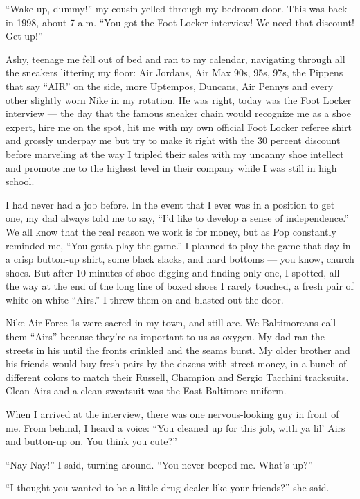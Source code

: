 ``Wake up, dummy!'' my cousin yelled through my bedroom door. This was
back in 1998, about 7 a.m. ``You got the Foot Locker interview! We need
that discount! Get up!''

Ashy, teenage me fell out of bed and ran to my calendar, navigating
through all the sneakers littering my floor: Air Jordans, Air Max 90s,
95s, 97s, the Pippens that say ``AIR'' on the side, more Uptempos,
Duncans, Air Pennys and every other slightly worn Nike in my rotation.
He was right, today was the Foot Locker interview --- the day that the
famous sneaker chain would recognize me as a shoe expert, hire me on the
spot, hit me with my own official Foot Locker referee shirt and grossly
underpay me but try to make it right with the 30 percent discount before
marveling at the way I tripled their sales with my uncanny shoe
intellect and promote me to the highest level in their company while I
was still in high school.

I had never had a job before. In the event that I ever was in a position
to get one, my dad always told me to say, ``I'd like to develop a sense
of independence.'' We all know that the real reason we work is for
money, but as Pop constantly reminded me, ``You gotta play the game.'' I
planned to play the game that day in a crisp button-up shirt, some black
slacks, and hard bottoms --- you know, church shoes. But after 10
minutes of shoe digging and finding only one, I spotted, all the way at
the end of the long line of boxed shoes I rarely touched, a fresh pair
of white-on-white ``Airs.'' I threw them on and blasted out the door.

Nike Air Force 1s were sacred in my town, and still are. We Baltimoreans
call them ``Airs'' because they're as important to us as oxygen. My dad
ran the streets in his until the fronts crinkled and the seams burst. My
older brother and his friends would buy fresh pairs by the dozens with
street money, in a bunch of different colors to match their Russell,
Champion and Sergio Tacchini tracksuits. Clean Airs and a clean
sweatsuit was the East Baltimore uniform.

When I arrived at the interview, there was one nervous-looking guy in
front of me. From behind, I heard a voice: ``You cleaned up for this
job, with ya lil' Airs and button-up on. You think you cute?''

``Nay Nay!'' I said, turning around. ``You never beeped me. What's up?''

``I thought you wanted to be a little drug dealer like your friends?''
she said.


